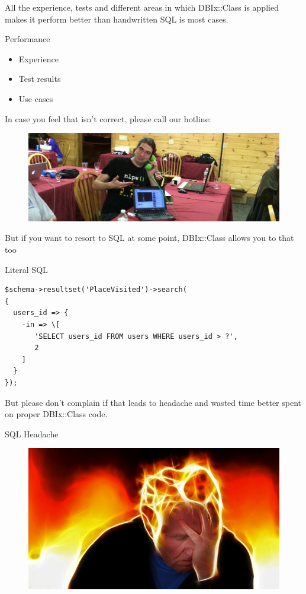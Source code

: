 All the experience, tests and different areas in which 
DBIx::Class is applied makes it perform better than
handwritten SQL is most cases.

\begin{frame}{Performance}
\begin{itemize}
\item Experience
\item Test results
\item Use cases
\end{itemize}
\end{frame}
 
In case you feel that isn't correct, please call our hotline:

\begin{frame}
\begin{figure}[!ht]
\centering
\includegraphics[width=1\linewidth]{img/perldance-2014-modern-tech.jpg}
\end{figure}
\end{frame}

But if you want to resort to SQL at some point, DBIx::Class allows you
to that too

\begin{frame}[fragile]{Literal SQL}
\begin{lstlisting}
$schema->resultset('PlaceVisited')->search(
{
  users_id => {
    -in => \[
       'SELECT users_id FROM users WHERE users_id > ?',
       2
    ]
  }
});
\end{lstlisting}
\end{frame}

But please don't complain if that leads to headache
and wasted time better spent on proper DBIx::Class
code.

\begin{frame}{SQL Headache}
\begin{figure}[!ht]
\centering
\includegraphics[width=1\linewidth]{img/stress.jpg}
\end{figure}
\end{frame}

